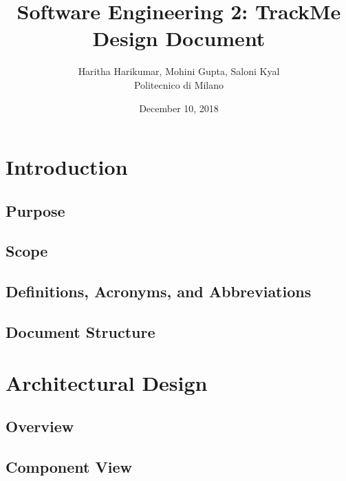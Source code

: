 \documentclass[12pt, a4paper]{report}
\begin{document}
\title{Software Engineering 2: TrackMe \\ \vspace{1em} Design Document}
\author{Haritha Harikumar, Mohini Gupta, Saloni Kyal\\
Politecnico di Milano}
\date{December 10, 2018}
\maketitle
\tableofcontents

\chapter{Introduction}
\label{ch:introduction}

\section{Purpose}


\section{Scope}


\section{Definitions, Acronyms, and Abbreviations}


\section{Document Structure}


\chapter{Architectural Design}
\label{ch:architectural_design}

\section{Overview}


\section{Component View}

\end{document}
